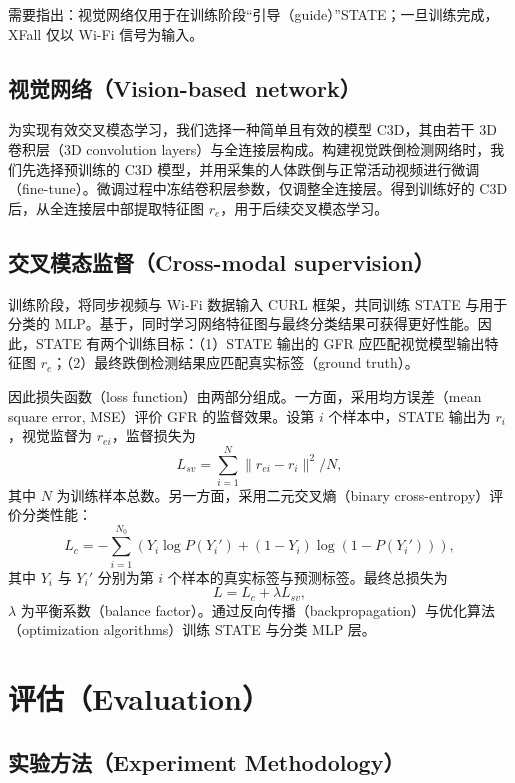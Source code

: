 \documentclass[UTF8,twocolumn]{ctexart}
\begin{document}
需要指出：视觉网络仅用于在训练阶段“引导（guide）”STATE；一旦训练完成，XFall 仅以 Wi\!-\!Fi 信号为输入。

\subsection{视觉网络（Vision-based network）}
为实现有效交叉模态学习，我们选择一种简单且有效的模型 C3D\cite{ref44}，其由若干 3D 卷积层（3D convolution layers）与全连接层构成。构建视觉跌倒检测网络时，我们先选择预训练的 C3D 模型，并用采集的人体跌倒与正常活动视频进行微调（fine-tune）。微调过程中冻结卷积层参数，仅调整全连接层。得到训练好的 C3D 后，从全连接层中部提取特征图 $r_e$，用于后续交叉模态学习。

\subsection{交叉模态监督（Cross-modal supervision）}
训练阶段，将同步视频与 Wi\!-\!Fi 数据输入 CURL 框架，共同训练 STATE 与用于分类的 MLP。基于\cite{ref45}，同时学习网络特征图与最终分类结果可获得更好性能。因此，STATE 有两个训练目标：（1）STATE 输出的 GFR 应匹配视觉模型输出特征图 $r_e$；（2）最终跌倒检测结果应匹配真实标签（ground truth）。

因此损失函数（loss function）由两部分组成。一方面，采用均方误差（mean square error, MSE）评价 GFR 的监督效果。设第 $i$ 个样本中，STATE 输出为 $r_i$，视觉监督为 $r_{ei}$，监督损失为
\begin{equation}
L_{sv}=\sum_{i=1}^{N}\|r_{ei}-r_i\|^{2}/N,
\label{eq14}
\end{equation}
其中 $N$ 为训练样本总数。另一方面，采用二元交叉熵（binary cross-entropy）评价分类性能：
\begin{equation}
L_c=-\sum_{i=1}^{N_0}\left(Y_i\log P(Y_i')+(1-Y_i)\log(1-P(Y_i'))\right),
\label{eq15}
\end{equation}
其中 $Y_i$ 与 $Y_i'$ 分别为第 $i$ 个样本的真实标签与预测标签。最终总损失为
\begin{equation}
L=L_c+\lambda L_{sv},
\label{eq16}
\end{equation}
$\lambda$ 为平衡系数（balance factor）。通过反向传播（backpropagation）与优化算法（optimization algorithms）训练 STATE 与分类 MLP 层。

\section{评估（Evaluation）}
\subsection{实验方法（Experiment Methodology）}
\end{document}
